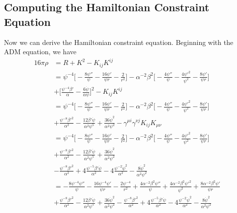 \documentclass[12pt]{article}
\numberwithin{equation}{section}
\begin{document}
\subsection{Computing the Hamiltonian Constraint Equation}
Now we can derive the Hamiltonian constraint equation.  Beginning with the ADM equation, we have
\begin{equation}
\begin{aligned}
16 \pi \rho &= R + K^2 - K_{ij} K^{ij}\\
&= \psi^{-4} \Big[ -\frac{8 \psi''}{\psi} - \frac{16 \psi'}{\psi r} - \frac{2}{r^{2}} \Big] - \alpha^{-2} \beta^2 \Big[ -\frac{4 \psi''}{\psi} - \frac{4 \psi'^2}{\psi^2}  - \frac{8 \psi'}{\psi r} \Big] \\
&+ \Big[ \frac{\psi^{-4} \beta'}{\alpha} - \frac{6 \dot{\psi}}{\alpha \psi} \Big]^2 - K_{ij} K^{ij} \\
&= \psi^{-4} \Big[ -\frac{8 \psi''}{\psi} - \frac{16 \psi'}{\psi r} - \frac{2}{r^{2}} \Big] - \alpha^{-2} \beta^2 \Big[ -\frac{4 \psi''}{\psi} - \frac{4 \psi'^2}{\psi^2}  - \frac{8 \psi'}{\psi r} \Big] \\
&+ \frac{\psi^{-8} \beta'^2}{\alpha^2} - \frac{12 \beta' \dot{\psi}}{\alpha^2 \psi^5} + \frac{36 \dot{\psi}^2}{\alpha^2 \psi^2} - \gamma^{\mu i} \gamma^{\nu j} K_{ij} K_{\mu \nu} \\
&= \psi^{-4} \Big[ -\frac{8 \psi''}{\psi} - \frac{16 \psi'}{\psi r} - \frac{2}{r^{2}} \Big] - \alpha^{-2} \beta^2 \Big[ -\frac{4 \psi''}{\psi} - \frac{4 \psi'^2}{\psi^2}  - \frac{8 \psi'}{\psi r} \Big] \\
&+ \frac{\psi^{-8} \beta'^2}{\alpha^2} - \frac{12 \beta' \dot{\psi}}{\alpha^2 \psi^5} + \frac{36 \dot{\psi}^2}{\alpha^2 \psi^2} \\
&- \frac{\psi^{-8} \beta'^2}{\alpha^2} + 4 \frac{\psi^{-5} \beta' \dot{\psi}}{\alpha^2} - 4 \frac{\psi^{-2} \dot{\psi}^2}{\alpha^2} - \frac{8 \dot{\psi}^2}{\alpha^2 \psi^{2}} \\
&= -\frac{8 \psi^{-4} \psi''}{\psi} - \frac{16 \psi^{-4} \psi'}{\psi r} - \frac{2 \psi^{-4}}{r^{2}} + \frac{4 \alpha^{-2} \beta^2 \psi''}{\psi} + \frac{4 \alpha^{-2} \beta^2 \psi'^2}{\psi^2}  + \frac{8 \alpha^{-2} \beta^2 \psi'}{\psi r} \\
&+ \frac{\psi^{-8} \beta'^2}{\alpha^2} - \frac{12 \beta' \dot{\psi}}{\alpha^2 \psi^5} + \frac{36 \dot{\psi}^2}{\alpha^2 \psi^2} - \frac{\psi^{-8} \beta'^2}{\alpha^2} + 4 \frac{\psi^{-5} \beta' \dot{\psi}}{\alpha^2} - 4 \frac{\psi^{-2} \dot{\psi}^2}{\alpha^2} - \frac{8 \dot{\psi}^2}{\alpha^2 \psi^{2}} \\
\end{aligned}
\end{equation}
\end{document}
